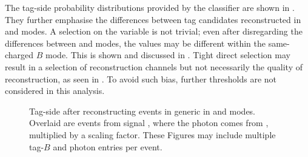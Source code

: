 The tag-side probability distributions provided by the \FEI classifier are shown in .
They further emphasise the differences between tag candidates reconstructed in \feiBp and \feiBz modes.
A selection on the \feiProb variable is not trivial;
even after disregarding the differences between \feiBp and \feiBz modes, 
the \feiProb values may be different within the same-charged $B$ mode.
This is shown and discussed in .
Tight direct selection may result in a selection of reconstruction channels but not necessarily the quality of reconstruction, as seen in .
To avoid such bias, further \feiProb thresholds are not considered in this analysis.

\begin{figure}[hbtp!]
    \centering
    \caption{\label{fig:sigprob_after_reco} Tag-side \feiProb after reconstructing \BtoXsgamma events in generic \MC in \feiBp and \feiBz modes.
    Overlaid are events from signal \MC, where the photon comes from \BtoXsgamma, multiplied by a scaling factor.
    These Figures may include multiple tag-$B$ and photon entries per event.
    }
\end{figure}

